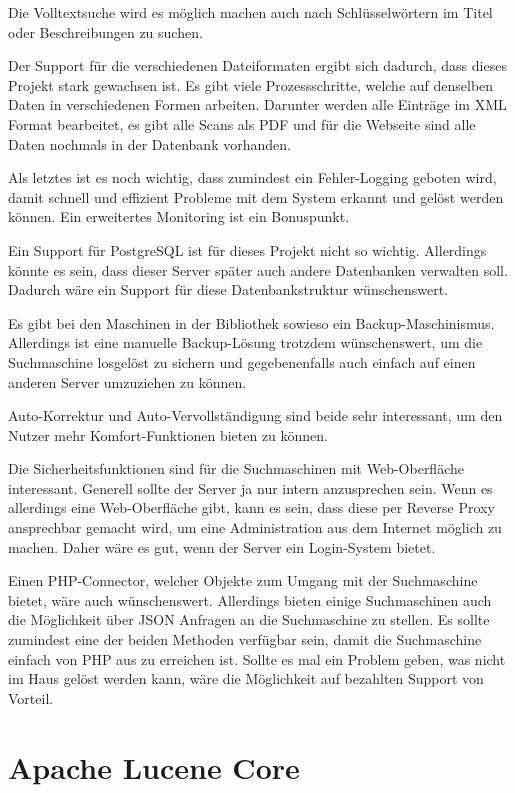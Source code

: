Die Volltextsuche wird es möglich machen auch nach Schlüsselwörtern im Titel oder Beschreibungen zu suchen.

Der Support für die verschiedenen Dateiformaten ergibt sich dadurch, dass dieses Projekt stark gewachsen ist. Es gibt viele Prozessschritte, welche auf denselben Daten in verschiedenen Formen arbeiten. Darunter werden alle Einträge im XML Format bearbeitet, es gibt alle Scans als PDF und für die Webseite sind alle Daten nochmals in der Datenbank vorhanden.

Als letztes ist es noch wichtig, dass zumindest ein Fehler-Logging geboten wird, damit schnell und effizient Probleme mit dem System erkannt und gelöst werden können. Ein erweitertes Monitoring ist ein Bonuspunkt.

Ein Support für PostgreSQL ist für dieses Projekt nicht so wichtig. Allerdings könnte es sein, dass dieser Server später auch andere Datenbanken verwalten soll. Dadurch wäre ein Support für diese Datenbankstruktur wünschenswert.

Es gibt bei den Maschinen in der Bibliothek sowieso ein Backup-Maschinismus. Allerdings ist eine manuelle Backup-Lösung trotzdem wünschenswert, um die Suchmaschine losgelöst zu sichern und gegebenenfalls auch einfach auf einen anderen Server umzuziehen zu können. 

Auto-Korrektur und Auto-Vervollständigung sind beide sehr interessant, um den Nutzer mehr Komfort-Funktionen bieten zu können.

Die Sicherheitsfunktionen sind für die Suchmaschinen mit Web-Oberfläche interessant. Generell sollte der Server ja nur intern anzusprechen sein. Wenn es allerdings eine Web-Oberfläche gibt, kann es sein, dass diese per Reverse Proxy ansprechbar gemacht wird, um eine Administration aus dem Internet möglich zu machen. Daher wäre es gut, wenn der Server ein Login-System bietet.

Einen PHP-Connector, welcher Objekte zum Umgang mit der Suchmaschine bietet, wäre auch wünschenswert. Allerdings bieten einige Suchmaschinen auch die Möglichkeit über JSON Anfragen an die Suchmaschine zu stellen. Es sollte zumindest eine der beiden Methoden verfügbar sein, damit die Suchmaschine einfach von PHP aus zu erreichen ist.
Sollte es mal ein Problem geben, was nicht im Haus gelöst werden kann, wäre die Möglichkeit auf bezahlten Support von Vorteil.

\section{Apache Lucene Core}
\label{lucenecore}

